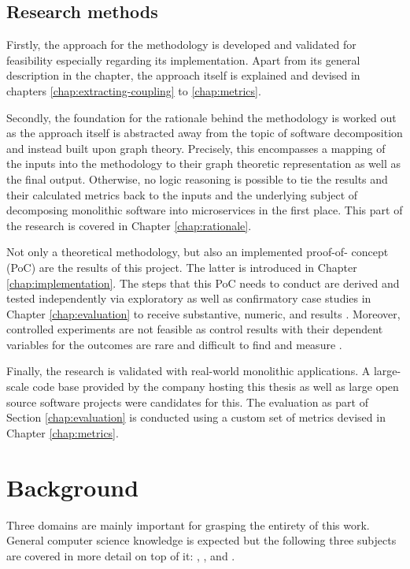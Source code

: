 \documentclass[12pt,a4paper]{report}
\begin{document}
\section{Research methods}

Firstly, the approach for the methodology is developed and validated for
feasibility especially regarding its implementation. Apart from its general
description in the \textit{} chapter, the approach itself
is explained and devised in chapters \ref{chap:extracting-coupling} to \ref{chap:metrics}.

Secondly, the foundation for the rationale behind the methodology is worked out
as the approach itself is abstracted away from the topic of software
decomposition and instead built upon graph theory. Precisely, this encompasses
a mapping of the inputs into the methodology to their graph theoretic
representation as well as the final output. Otherwise, no logic reasoning is
possible to tie the results and their calculated metrics back to the inputs and
the underlying subject of decomposing monolithic software into microservices in
the first place. This part of the research is covered in Chapter \ref{chap:rationale}.

Not only a theoretical methodology, but also an implemented proof-of\hyp
concept (PoC) are the results of this project. The latter is introduced in
Chapter \ref{chap:implementation}. The steps that this PoC needs to conduct are
derived and tested independently via exploratory as well as confirmatory case
studies in Chapter \ref{chap:evaluation} to receive substantive, numeric, and
results \cite{easterbrook2008selecting}. Moreover, controlled
experiments are not feasible as control results with their dependent variables
for the outcomes are rare and difficult to find and measure
\cite{easterbrook2008selecting}.

Finally, the research is validated with real-world monolithic applications. A
large-scale code base provided by the company hosting this thesis as well as
large open source software projects were candidates for this. The evaluation as
part of Section \ref{chap:evaluation} is conducted using a custom set of
metrics devised in Chapter \ref{chap:metrics}.




\chapter{Background} \label{chap:background}

Three domains are mainly important for grasping the entirety of this work.
General computer science knowledge is expected but the following three subjects
are covered in more detail on top of it: \textit{},
\textit{}, and
\textit{}.
\end{document}
